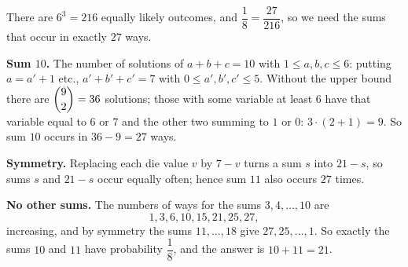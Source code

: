 There are $6^3=216$ equally likely outcomes, and $\dfrac{1}{8}=\dfrac{27}{216}$, so we need the sums that occur in exactly $27$ ways.

\textbf{Sum $10$.} The number of solutions of $a+b+c=10$ with $1\le a,b,c\le6$: putting $a=a'+1$ etc., $a'+b'+c'=7$ with $0\le a',b',c'\le5$. Without the upper bound there are $\dbinom92=36$ solutions; those with some variable at least $6$ have that variable equal to $6$ or $7$ and the other two summing to $1$ or $0$: $3\cdot(2+1)=9$. So sum $10$ occurs in $36-9=27$ ways.

\textbf{Symmetry.} Replacing each die value $v$ by $7-v$ turns a sum $s$ into $21-s$, so sums $s$ and $21-s$ occur equally often; hence sum $11$ also occurs $27$ times.

\textbf{No other sums.} The numbers of ways for the sums $3,4,\dots,10$ are
\[1,3,6,10,15,21,25,27,\]
increasing, and by symmetry the sums $11,\dots,18$ give $27,25,\dots,1$. So exactly the sums $10$ and $11$ have probability $\dfrac{1}{8}$, and the answer is $10+11=\boxed{21}$.
